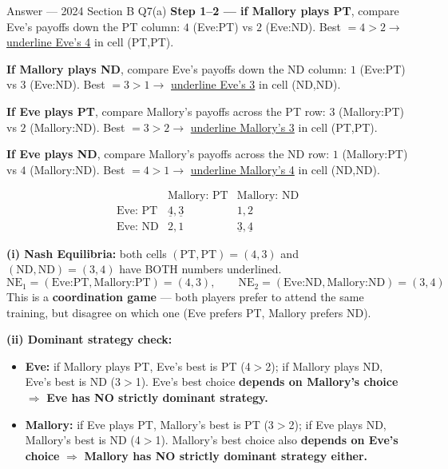 \documentclass[12pt,a4paper]{article}
\begin{document}
\begin{solbox}{Answer --- 2024 Section B Q7(a)}
\textbf{Step 1--2 --- if Mallory plays PT}, compare Eve's payoffs down the PT column: $4$ (Eve:PT) vs $2$ (Eve:ND). Best $=4>2 \to$ \underline{underline Eve's 4} in cell (PT,PT).

\textbf{If Mallory plays ND}, compare Eve's payoffs down the ND column: $1$ (Eve:PT) vs $3$ (Eve:ND). Best $=3>1 \to$ \underline{underline Eve's 3} in cell (ND,ND).

\textbf{If Eve plays PT}, compare Mallory's payoffs across the PT row: $3$ (Mallory:PT) vs $2$ (Mallory:ND). Best $=3>2 \to$ \underline{underline Mallory's 3} in cell (PT,PT).

\textbf{If Eve plays ND}, compare Mallory's payoffs across the ND row: $1$ (Mallory:PT) vs $4$ (Mallory:ND). Best $=4>1 \to$ \underline{underline Mallory's 4} in cell (ND,ND).

\[
\begin{array}{c|cc}
 & \text{Mallory: PT} & \text{Mallory: ND} \\\hline
\text{Eve: PT} & \underline{4},\underline{3} & 1,2 \\
\text{Eve: ND} & 2,1 & \underline{3},\underline{4}
\end{array}
\]

\textbf{(i) Nash Equilibria:} both cells $(\text{PT},\text{PT})=(4,3)$ and $(\text{ND},\text{ND})=(3,4)$ have BOTH numbers underlined.
\[
\boxed{\text{NE}_1=(\text{Eve:PT},\text{Mallory:PT})=(4,3), \qquad \text{NE}_2=(\text{Eve:ND},\text{Mallory:ND})=(3,4)}
\]
This is a \textbf{coordination game} --- both players prefer to attend the same training, but disagree on which one (Eve prefers PT, Mallory prefers ND).

\textbf{(ii) Dominant strategy check:}
\begin{itemize}[noitemsep]
  \item \textbf{Eve:} if Mallory plays PT, Eve's best is PT (4$>$2); if Mallory plays ND, Eve's best is ND (3$>$1). Eve's best choice \textbf{depends on Mallory's choice} $\Rightarrow$ \textbf{Eve has NO strictly dominant strategy.}
  \item \textbf{Mallory:} if Eve plays PT, Mallory's best is PT (3$>$2); if Eve plays ND, Mallory's best is ND (4$>$1). Mallory's best choice also \textbf{depends on Eve's choice} $\Rightarrow$ \textbf{Mallory has NO strictly dominant strategy either.}
\end{itemize}
\end{solbox}
\end{document}
